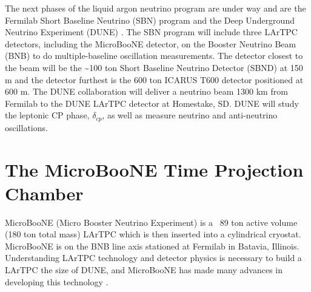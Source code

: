 The next phases of the liquid argon neutrino program are under way and are the Fermilab Short Baseline Neutrino (SBN) program \cite{sbn} and the Deep Underground Neutrino Experiment (DUNE) \cite{dune}. The SBN program will include three LArTPC detectors, including the MicroBooNE detector, on the Booster Neutrino Beam (BNB) to do multiple-baseline oscillation measurements. The detector closest to the beam will be the \sim 100 ton Short Baseline Neutrino Detector (SBND)\cite{sbnd} at 150 m and the detector furthest is the 600 ton ICARUS T600 \cite{icarus_t600} detector positioned at 600 m. The DUNE collaboration will deliver a neutrino beam 1300 km from Fermilab to the DUNE LArTPC detector at Homestake, SD. DUNE will study the leptonic CP phase, $\delta_{cp}$, as well as measure neutrino and anti-neutrino oscillations. 
\section{The MicroBooNE Time Projection Chamber}
MicroBooNE \cite{microboone}(Micro Booster Neutrino Experiment) is a ~89 ton active volume (180 ton total mass) LArTPC which is then inserted into a cylindrical cryostat. MicroBooNE is on the BNB line axis stationed at Fermilab in Batavia, Illinois. Understanding LArTPC technology and detector physics is necessary to build a LArTPC the size of DUNE, and MicroBooNE has made many advances in developing this technology\cite{noisechar} \cite{michel}. 

